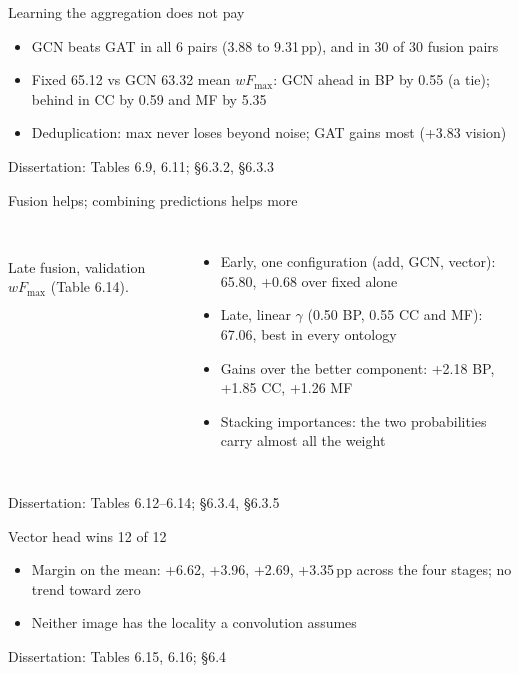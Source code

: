 \documentclass[aspectratio=169,10pt]{beamer}
\newcommand{\src}[1]{\par\vfill\hfill{\scriptsize\color{gray}Dissertation: #1}}
\newcommand{\wF}{wF_{\max}}
\begin{document}
\begin{frame}{Learning the aggregation does not pay}
  \begin{center}\small\TabGNN\end{center}
  \begin{itemize}
    \item GCN beats GAT in all 6 pairs (3.88 to 9.31\,pp), and in 30 of 30 fusion pairs
    \item Fixed 65.12 vs GCN 63.32 mean $\wF$: GCN ahead in BP by 0.55 (a tie); behind in CC by 0.59 and MF by 5.35
    \item Deduplication: max never loses beyond noise; GAT gains most (+3.83 vision)
  \end{itemize}
  \src{Tables 6.9, 6.11; §6.3.2, §6.3.3}
\end{frame}

\begin{frame}{Fusion helps; combining predictions helps more}
  \begin{columns}[T]
    \resizebox{\linewidth}{!}{\TabLate}\\
    {\scriptsize Late fusion, validation $\wF$ (Table 6.14).}
    \begin{itemize}
      \item Early, one configuration (add, GCN, vector): 65.80, +0.68 over fixed alone
      \item Late, linear $\gamma$ (0.50 BP, 0.55 CC and MF): 67.06, best in every ontology
      \item Gains over the better component: +2.18 BP, +1.85 CC, +1.26 MF
      \item Stacking importances: the two probabilities carry almost all the weight
    \end{itemize}
  \end{columns}
  \src{Tables 6.12--6.14; §6.3.4, §6.3.5}
\end{frame}

\begin{frame}{Vector head wins 12 of 12}
  \begin{center}\small\TabVV\end{center}
  \begin{itemize}
    \item Margin on the mean: +6.62, +3.96, +2.69, +3.35\,pp across the four stages; no trend toward zero
    \item Neither image has the locality a convolution assumes
  \end{itemize}
  \src{Tables 6.15, 6.16; §6.4}
\end{frame}
\end{document}
